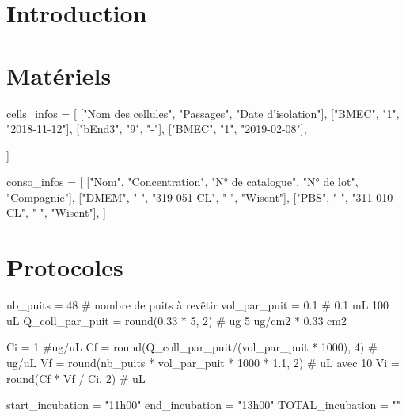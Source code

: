 \documentclass[a4paper,12pt]{article}
\newcommand{\PATH}[2]{"C:/Users/Florian/OneDrive - Universite de Montreal/LaTeX/BioTex/BioTex/#1/#2"}
\begin{document}
\title{}
\author{Florian Bernard}
\date{Le \today} 
\maketitle

\section{Introduction}

\section{Matériels}

\begin{pycode}
cells_infos = [
    ["Nom des cellules", "Passages", "Date d'isolation"],
    ["BMEC", "1", "2018-11-12"],
    ["bEnd3", "9", "-"],
    ["BMEC", "1", "2019-02-08"],

]
\end{pycode}


\begin{pycode}
conso_infos = [
    ["Nom", "Concentration", "N° de catalogue", "N° de lot", "Compagnie"],
    ["DMEM", "-", "319-051-CL", "-", "Wisent"],
    ["PBS", "-", "311-010-CL", "-", "Wisent"],
]
\end{pycode}


\section{Protocoles}

\begin{pycode}

nb_puits = 48 # nombre de puits à revêtir
vol_par_puit = 0.1 # 0.1 mL 100 uL 
Q_coll_par_puit = round(0.33 * 5, 2) # ug 5 ug/cm2 * 0.33 cm2

Ci = 1 #ug/uL
Cf = round(Q_coll_par_puit/(vol_par_puit * 1000), 4) # ug/uL
Vf = round(nb_puits * vol_par_puit * 1000 * 1.1, 2) # uL avec 10%
Vi = round(Cf * Vf / Ci, 2) # uL

start_incubation = "11h00"
end_incubation = "13h00"
TOTAL_incubation = ""

\end{pycode}

\end{document}
